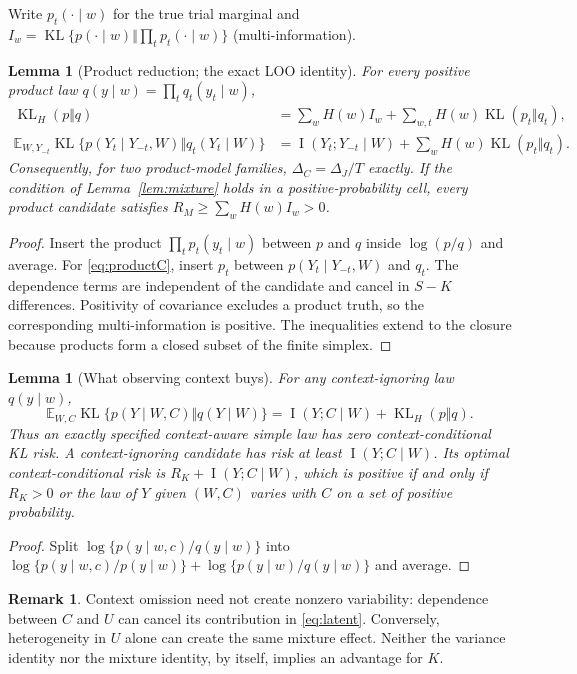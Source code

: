 \documentclass[11pt,letterpaper]{article}
\theoremstyle{plain}
\newtheorem{lemma}[theorem]{Lemma}
\theoremstyle{definition}
\newtheorem{remark}[theorem]{Remark}
\newcommand{\KL}{\operatorname{KL}}
\newcommand{\E}{\mathbb E}
\newcommand{\IP}{\operatorname{I}}
\begin{document}
Write $p_t(\cdot\mid w)$ for the true trial marginal and $I_w=\KL\{p(\cdot\mid w)\Vert\prod_t p_t(\cdot\mid w)\}$ (multi-information).
\begin{lemma}[Product reduction; the exact LOO identity]\label{lem:product}
For every positive product law $q(y\mid w)=\prod_tq_t(y_t\mid w)$,
\begin{align}\label{eq:productKL}
\KL_H(p\Vert q)&=\sum_wH(w)I_w+\sum_{w,t}H(w)\KL(p_t\Vert q_t),\\
\E_{W,Y_{-t}}\KL\{p(Y_t\mid Y_{-t},W)\Vert q_t(Y_t\mid W)\}
&=\IP(Y_t;Y_{-t}\mid W)+\sum_wH(w)\KL(p_t\Vert q_t).\label{eq:productC}
\end{align}
Consequently, for two product-model families, $\Delta_C=\Delta_J/T$ exactly. If the condition of Lemma~\ref{lem:mixture} holds in a positive-probability cell, every product candidate satisfies $R_M\ge\sum_wH(w)I_w>0$.
\end{lemma}
\begin{proof}
Insert the product $\prod_tp_t(y_t\mid w)$ between $p$ and $q$ inside $\log(p/q)$ and average. For \eqref{eq:productC}, insert $p_t$ between $p(Y_t\mid Y_{-t},W)$ and $q_t$. The dependence terms are independent of the candidate and cancel in $S-K$ differences. Positivity of covariance excludes a product truth, so the corresponding multi-information is positive. The inequalities extend to the closure because products form a closed subset of the finite simplex.
\end{proof}

\begin{lemma}[What observing context buys]\label{lem:context}
For any context-ignoring law $q(y\mid w)$,
\begin{equation}\label{eq:mutual}
\E_{W,C}\KL\{p(Y\mid W,C)\Vert q(Y\mid W)\}
=\IP(Y;C\mid W)+\KL_H(p\Vert q).
\end{equation}
Thus an exactly specified context-aware simple law has zero \emph{context-conditional} KL risk. A context-ignoring candidate has risk at least $\IP(Y;C\mid W)$. Its optimal context-conditional risk is $R_K+\IP(Y;C\mid W)$, which is positive if and only if $R_K>0$ or the law of $Y$ given $(W,C)$ varies with $C$ on a set of positive probability.
\end{lemma}
\begin{proof}
Split $\log\{p(y\mid w,c)/q(y\mid w)\}$ into $\log\{p(y\mid w,c)/p(y\mid w)\}+\log\{p(y\mid w)/q(y\mid w)\}$ and average.
\end{proof}
\begin{remark}
Context omission need not create nonzero variability: dependence between $C$ and $U$ can cancel its contribution in \eqref{eq:latent}. Conversely, heterogeneity in $U$ alone can create the same mixture effect. Neither the variance identity nor the mixture identity, by itself, implies an advantage for $K$.
\end{remark}
\end{document}
